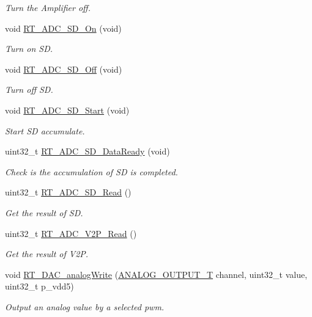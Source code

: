 \begin{DoxyCompactItemize}
\begin{DoxyCompactList}\small\item\em Turn the Amplifier off. \end{DoxyCompactList}\item 
void \mbox{\hyperlink{a00002_a3bb0bbb7c349af23c8e5f1b0d8408a07}{R\+T\+\_\+\+A\+D\+C\+\_\+\+S\+D\+\_\+\+On}} (void)
\begin{DoxyCompactList}\small\item\em Turn on SD. \end{DoxyCompactList}\item 
void \mbox{\hyperlink{a00002_a1934526cb3d40a1b0ae7a0f19597a4ff}{R\+T\+\_\+\+A\+D\+C\+\_\+\+S\+D\+\_\+\+Off}} (void)
\begin{DoxyCompactList}\small\item\em Turn off SD. \end{DoxyCompactList}\item 
void \mbox{\hyperlink{a00002_ac75cab97ce7cce47671dd8ef34e920d8}{R\+T\+\_\+\+A\+D\+C\+\_\+\+S\+D\+\_\+\+Start}} (void)
\begin{DoxyCompactList}\small\item\em Start SD accumulate. \end{DoxyCompactList}\item 
uint32\+\_\+t \mbox{\hyperlink{a00002_a7fd97b414a33170e6013c88f37e028a9}{R\+T\+\_\+\+A\+D\+C\+\_\+\+S\+D\+\_\+\+Data\+Ready}} (void)
\begin{DoxyCompactList}\small\item\em Check is the accumulation of SD is completed. \end{DoxyCompactList}\item 
uint32\+\_\+t \mbox{\hyperlink{a00002_a5532ac461de55576a3875b29300c8536}{R\+T\+\_\+\+A\+D\+C\+\_\+\+S\+D\+\_\+\+Read}} ()
\begin{DoxyCompactList}\small\item\em Get the result of SD. \end{DoxyCompactList}\item 
uint32\+\_\+t \mbox{\hyperlink{a00002_aeb7d0cb0a7849fc5736dae01fe607910}{R\+T\+\_\+\+A\+D\+C\+\_\+\+V2\+P\+\_\+\+Read}} ()
\begin{DoxyCompactList}\small\item\em Get the result of V2P. \end{DoxyCompactList}\item 
void \mbox{\hyperlink{a00002_ae07217c068930cb51221cac4b42d5338}{R\+T\+\_\+\+D\+A\+C\+\_\+analog\+Write}} (\mbox{\hyperlink{a00002_ae9e6d7c812d9175f04b9a2d31a74f737}{A\+N\+A\+L\+O\+G\+\_\+\+O\+U\+T\+P\+U\+T\+\_\+T}} channel, uint32\+\_\+t value, uint32\+\_\+t p\+\_\+vdd5)
\begin{DoxyCompactList}\small\item\em Output an analog value by a selected pwm. \end{DoxyCompactList}\end{DoxyCompactItemize}


